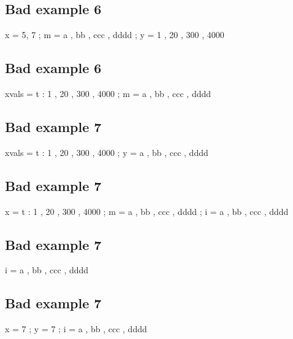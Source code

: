 \documentclass[12pt]{article}
\begin{document}
\subsection{Bad example 6}

\begin{functable}
    x = 5, 7 ;
    m = a , bb , ccc , dddd ;
    y = 1 , 20 , 300 , 4000 
\end{functable}


\subsection{Bad example 6}

\begin{functable}
    xvals = t : 1 , 20 , 300 , 4000 ;
    m     = a , bb , ccc , dddd 
\end{functable}


\subsection{Bad example 7}

\begin{functable}
    xvals = t : 1 , 20 , 300 , 4000 ;
    y     = a , bb , ccc , dddd 
\end{functable}


\subsection{Bad example 7}

\begin{functable}
    x = t : 1 , 20 , 300 , 4000 ;
    m = a , bb , ccc , dddd ;
    i = a , bb , ccc , dddd 
\end{functable}


\subsection{Bad example 7}

\begin{functable}
    i = a , bb , ccc , dddd 
\end{functable}


\subsection{Bad example 7}

\begin{functable}
    x = 7 ;
    y = 7 ;
    i = a , bb , ccc , dddd 
\end{functable}
\end{document}

